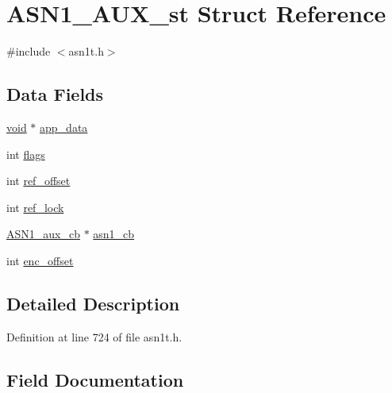 \hypertarget{struct_a_s_n1___a_u_x__st}{}\section{A\+S\+N1\+\_\+\+A\+U\+X\+\_\+st Struct Reference}
\label{struct_a_s_n1___a_u_x__st}


{\ttfamily \#include $<$asn1t.\+h$>$}

\subsection*{Data Fields}
\begin{DoxyCompactItemize}
\item 
\hyperlink{hw__4758__cca_8h_afad4d591c7931ff6dc5bf69c76c96aa0}{void} $\ast$ \hyperlink{struct_a_s_n1___a_u_x__st_a2d755a5df39e3da5ae2a0630fbe24c41}{app\+\_\+data}
\item 
int \hyperlink{struct_a_s_n1___a_u_x__st_ac8bf36fe0577cba66bccda3a6f7e80a4}{flags}
\item 
int \hyperlink{struct_a_s_n1___a_u_x__st_a3095f2737ee572135575b02290f19b6f}{ref\+\_\+offset}
\item 
int \hyperlink{struct_a_s_n1___a_u_x__st_aa25c99eb7f2ee9ee5d1f4eb4eb33b995}{ref\+\_\+lock}
\item 
\hyperlink{include_2openssl_2asn1t_8h_a2b027ba8d1c547004686872d2ce6a295}{A\+S\+N1\+\_\+aux\+\_\+cb} $\ast$ \hyperlink{struct_a_s_n1___a_u_x__st_a7949f7f8d6a797441e31fe5a15675b0e}{asn1\+\_\+cb}
\item 
int \hyperlink{struct_a_s_n1___a_u_x__st_a253f42df0c986d3f6e4f7a4532c23b86}{enc\+\_\+offset}
\end{DoxyCompactItemize}


\subsection{Detailed Description}


Definition at line 724 of file asn1t.\+h.



\subsection{Field Documentation}
